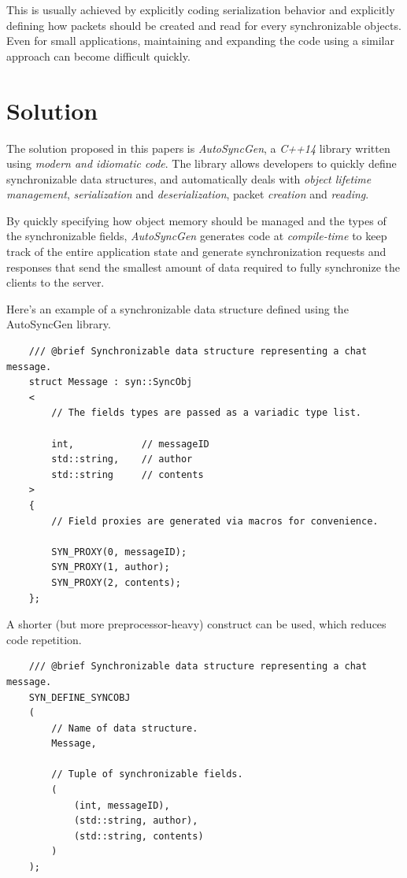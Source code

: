 \documentclass{report}
\begin{document}
            This is usually achieved by explicitly coding serialization behavior and explicitly defining how packets should be created and read for every synchronizable objects. Even for small applications, maintaining and expanding the code using a similar approach can become difficult quickly.

        \section{Solution}
            The solution proposed in this papers is \emph{AutoSyncGen}, a \emph{C++14} library written using \emph{modern and idiomatic code}.
            The library allows developers to quickly define synchronizable data structures, and automatically deals with \emph{object lifetime management}, \emph{serialization} and \emph{deserialization}, packet \emph{creation} and \emph{reading}.

            By quickly specifying how object memory should be managed and the types of the synchronizable fields, \emph{AutoSyncGen} generates code at \emph{compile-time} to keep track of the entire application state and generate synchronization requests and responses that send the smallest amount of data required to fully synchronize the clients to the server.

            \newpage

            Here's an example of a synchronizable data structure defined using the AutoSyncGen library.

            \begin{verbatim}
    /// @brief Synchronizable data structure representing a chat message.
    struct Message : syn::SyncObj
    <
        // The fields types are passed as a variadic type list.

        int,            // messageID
        std::string,    // author
        std::string     // contents
    >
    {
        // Field proxies are generated via macros for convenience.

        SYN_PROXY(0, messageID);
        SYN_PROXY(1, author);
        SYN_PROXY(2, contents);
    };
            \end{verbatim}

            A shorter (but more preprocessor-heavy) construct can be used, which reduces code repetition.

            \begin{verbatim}
    /// @brief Synchronizable data structure representing a chat message.
    SYN_DEFINE_SYNCOBJ
    (
        // Name of data structure.
        Message,

        // Tuple of synchronizable fields.
        (
            (int, messageID),
            (std::string, author),
            (std::string, contents)
        )
    );
            \end{verbatim}
\end{document}
